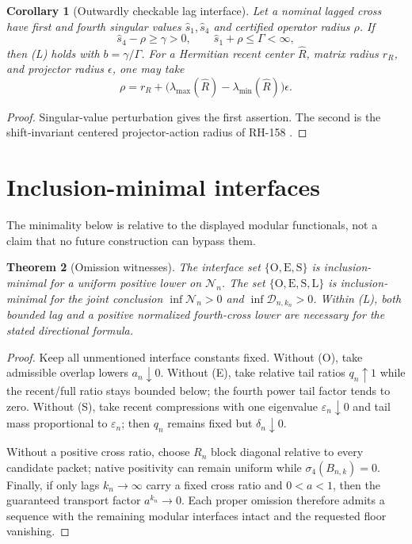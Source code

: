 \documentclass[12pt]{article}
\newtheorem{theorem}{Theorem}
\newtheorem{corollary}[theorem]{Corollary}
\begin{document}
\begin{corollary}[Outwardly checkable lag interface]\label{cor:outward}
Let a nominal lagged cross have first and fourth singular values
$\widehat s_1,\widehat s_4$ and certified operator radius $\rho$.  If
\[
 \widehat s_4-\rho\geq\gamma>0,
 \qquad \widehat s_1+\rho\leq\Gamma<\infty,
\]
then (L) holds with $b=\gamma/\Gamma$.  For a Hermitian recent center
$\widehat R$, matrix radius $r_R$, and projector radius $\epsilon$, one may
take
\[
 \rho=r_R+\bigl(\lambda_{\max}(\widehat R)-
 \lambda_{\min}(\widehat R)\bigr)\epsilon.
\]
\end{corollary}
\begin{proof}
Singular-value perturbation gives the first assertion.  The second is the
shift-invariant centered projector-action radius of RH-158
\citep{Bhatia1997,StewartSun1990}.
\end{proof}

\section{Inclusion-minimal interfaces}
The minimality below is relative to the displayed modular functionals, not a
claim that no future construction can bypass them.

\begin{theorem}[Omission witnesses]\label{thm:minimal}
The interface set $\{\mathrm O,\mathrm E,\mathrm S\}$ is inclusion-minimal
for a uniform positive lower on $\mathcal N_n$.  The set
$\{\mathrm O,\mathrm E,\mathrm S,\mathrm L\}$ is inclusion-minimal for the
joint conclusion $\inf\mathcal N_n>0$ and $\inf\mathcal D_{n,k_n}>0$.
Within (L), both bounded lag and a positive normalized fourth-cross lower are
necessary for the stated directional formula.
\end{theorem}
\begin{proof}
Keep all unmentioned interface constants fixed.  Without (O), take admissible
overlap lowers $a_n\downarrow0$.  Without (E), take relative tail ratios
$q_n\uparrow1$ while the recent/full ratio stays bounded below; the fourth
power tail factor tends to zero.  Without (S), take recent compressions with
one eigenvalue $\varepsilon_n\downarrow0$ and tail mass proportional to
$\varepsilon_n$; then $q_n$ remains fixed but $\delta_n\downarrow0$.

Without a positive cross ratio, choose $R_n$ block diagonal relative to every
candidate packet; native positivity can remain uniform while
$\sigma_4(B_{n,k})=0$.  Finally, if only lags $k_n\to\infty$ carry a fixed
cross ratio and $0<a<1$, then the guaranteed transport factor
$a^{k_n}\to0$.  Each proper omission therefore admits a sequence with the
remaining modular interfaces intact and the requested floor vanishing.
\end{proof}
\end{document}
